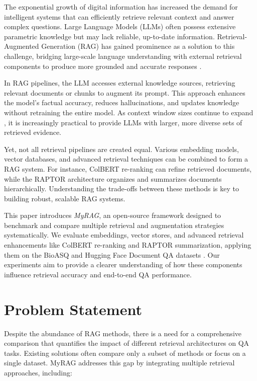 \documentclass{scrartcl}
\begin{document}
The exponential growth of digital information has increased the demand for intelligent systems that can efficiently retrieve relevant context and answer complex questions. Large Language Models (LLMs) often possess extensive parametric knowledge but may lack reliable, up-to-date information. Retrieval-Augmented Generation (RAG) has gained prominence as a solution to this challenge, bridging large-scale language understanding with external retrieval components to produce more grounded and accurate responses \cite{lewis2020retrieval, guu2020realm, izacard2022atlas}.

In RAG pipelines, the LLM accesses external knowledge sources, retrieving relevant documents or chunks to augment its prompt. This approach enhances the model’s factual accuracy, reduces hallucinations, and updates knowledge without retraining the entire model. As context window sizes continue to expand \cite{liu2023lost}, it is increasingly practical to provide LLMs with larger, more diverse sets of retrieved evidence.

Yet, not all retrieval pipelines are created equal. Various embedding models, vector databases, and advanced retrieval techniques can be combined to form a RAG system. For instance, ColBERT \cite{khattab2020colbert} re-ranking can refine retrieved documents, while the RAPTOR architecture \cite{wu2021recursively, raptor2024} organizes and summarizes documents hierarchically. Understanding the trade-offs between these methods is key to building robust, scalable RAG systems.

This paper introduces \textit{MyRAG}, an open-source framework designed to benchmark and compare multiple retrieval and augmentation strategies systematically. We evaluate embeddings, vector stores, and advanced retrieval enhancements like ColBERT re-ranking and RAPTOR summarization, applying them on the BioASQ \cite{bioasq2023} and Hugging Face Document QA datasets \cite{huggingface2024docqa}. Our experiments aim to provide a clearer understanding of how these components influence retrieval accuracy and end-to-end QA performance.

\section{Problem Statement}

Despite the abundance of RAG methods, there is a need for a comprehensive comparison that quantifies the impact of different retrieval architectures on QA tasks. Existing solutions often compare only a subset of methods or focus on a single dataset. MyRAG addresses this gap by integrating multiple retrieval approaches, including:
\end{document}
